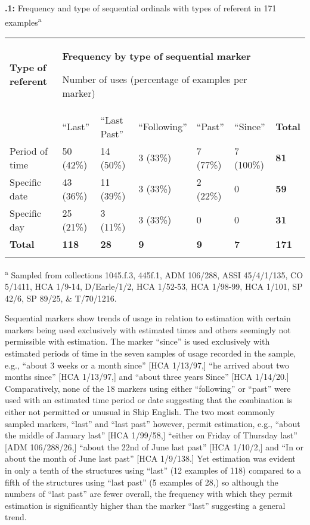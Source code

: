\textbf{.1:} Frequency and type of sequential ordinals with types of referent in 171 examples\textsuperscript{a}

\begin{tabularx}{\textwidth}{XXXXXXX}
\lsptoprule
\textbf{Type} \textbf{of} \textbf{referent} & \multicolumn{5}{X}{\textbf{Frequency} \textbf{by} \textbf{type} \textbf{of} \textbf{sequential} \textbf{marker}

Number of uses (percentage of examples per marker)} & \\
& “Last” & “Last Past” & “Following” & “Past” & “Since” & \textbf{Total}\\
Period of time & 50 (42\%) & 14 (50\%) & 3 (33\%) & 7 (77\%) & 7 (100\%) & \textbf{81}\\
Specific date & 43 (36\%) & 11 (39\%) & 3 (33\%) & 2 (22\%) & 0 & \textbf{59}\\
Specific day & 25 (21\%) & 3 (11\%) & 3 (33\%) & 0 & 0 & \textbf{31}\\
 \textbf{Total} & \textbf{118}    &  \textbf{28} &     \textbf{9} &  \textbf{9} &  \textbf{7} & \textbf{171}\\
\lspbottomrule
\end{tabularx}
\textsuperscript{a} Sampled from collections 1045.f.3, 445f.1, ADM 106/288, ASSI 45/4/1/135, CO 5/1411, HCA 1/9-14, D/Earle/1/2, HCA 1/52-53, HCA 1/98-99, HCA 1/101, SP 42/6, SP 89/25, \& T/70/1216.

  Sequential markers show trends of usage in relation to estimation with certain markers being used exclusively with estimated times and others seemingly not permissible with estimation. The marker “since” is used exclusively with estimated periods of time in the seven samples of usage recorded in the sample, e.g., “about 3 weeks or a month since” [HCA 1/13/97,] “he arrived about two months since” [HCA 1/13/97,] and “about three years Since” [HCA 1/14/20.] Comparatively, none of the 18 markers using either “following” or “past” were used with an estimated time period or date suggesting that the combination is either not permitted or unusual in Ship English. The two most commonly sampled markers, “last” and “last past” however, permit estimation, e.g., “about the middle of January last” [HCA 1/99/58,] “either on Friday of Thursday last” [ADM 106/288/26,] “about the 22nd of June last past” [HCA 1/10/2,] and “In or about the month of June last past” [HCA 1/9/138.] Yet estimation was evident in only a tenth of the structures using “last” (12 examples of 118) compared to a fifth of the structures using “last past” (5 examples of 28,) so although the numbers of “last past” are fewer overall, the frequency with which they permit estimation is significantly higher than the marker “last” suggesting a general trend. 

